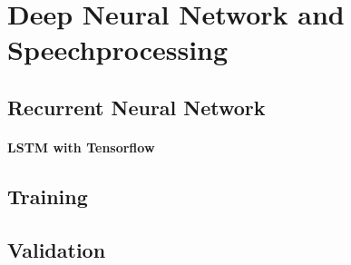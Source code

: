 
\chapter{Deep Neural Network and Speechprocessing}

\section{Recurrent Neural Network}

\subsubsection{LSTM with Tensorflow}

\section{Training}

\section{Validation}